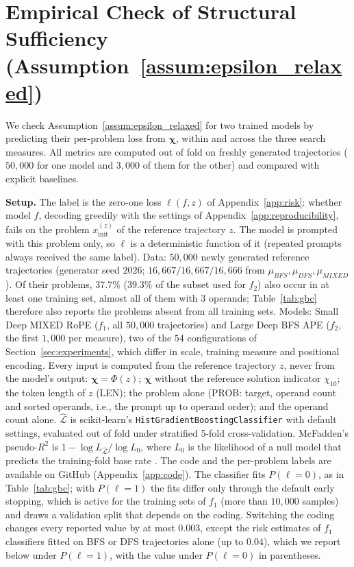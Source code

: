 \section{Empirical Check of Structural Sufficiency (\texorpdfstring{Assumption~\ref{assum:epsilon_relaxed}}{Assumption 1})} %
\label{app:gbc_check}
We check Assumption~\ref{assum:epsilon_relaxed} for two trained models by predicting their per-problem loss from $\boldsymbol{\chi}$, within and across the three search measures. All metrics are computed out of fold on freshly generated trajectories ($50{,}000$ for one model and $3{,}000$ of them for the other) and compared with explicit baselines.

\textbf{Setup.} The label is the zero-one loss $\ell(f,z)$ of Appendix~\ref{app:risk}: whether model $f$, decoding greedily with the settings of Appendix~\ref{app:reproducibility}, fails on the problem $x_{\mathrm{init}}^{(z)}$ of the reference trajectory $z$. The model is prompted with this problem only, so $\ell$ is a deterministic function of it (repeated prompts always received the same label). Data: $50{,}000$ newly generated reference trajectories (generator seed $2026$; $16{,}667/16{,}667/16{,}666$ from $\mu_{BFS},\mu_{DFS},\mu_{MIXED}$). Of their problems, $37.7\%$ ($39.3\%$ of the subset used for $f_2$) also occur in at least one training set, almost all of them with $3$ operands; Table~\ref{tab:gbc} therefore also reports the problems absent from all training sets. Models: Small Deep MIXED RoPE ($f_1$, all $50{,}000$ trajectories) and Large Deep BFS APE ($f_2$, the first $1{,}000$ per measure), two of the $54$ configurations of Section~\ref{sec:experiments}, which differ in scale, training measure and positional encoding. Every input is computed from the reference trajectory $z$, never from the model's output: $\boldsymbol{\chi}=\Phi(z)$; $\boldsymbol{\chi}$ without the reference solution indicator $\chi_{10}$; the token length of $z$ (LEN); the problem alone (PROB: target, operand count and sorted operands, i.e., the prompt up to operand order); and the operand count alone. $\hat{\mathcal{L}}$ is scikit-learn's \texttt{HistGradientBoostingClassifier} \citep{pedregosa2011scikit} with default settings, evaluated out of fold under stratified 5-fold cross-validation. McFadden's pseudo-$R^2$ is $1-\log L_{\hat{\mathcal{L}}}/\log L_0$, where $L_0$ is the likelihood of a null model that predicts the training-fold base rate \citep{mcfadden1979quantitative}. The code and the per-problem labels are available on GitHub (Appendix~\ref{app:code}). The classifier fits $P(\ell{=}0)$, as in Table~\ref{tab:gbc}; with $P(\ell{=}1)$ the fits differ only through the default early stopping, which is active for the training sets of $f_1$ (more than $10{,}000$ samples) and draws a validation split that depends on the coding. Switching the coding changes every reported value by at most $0.003$, except the risk estimates of $f_1$ classifiers fitted on BFS or DFS trajectories alone (up to $0.04$), which we report below under $P(\ell{=}1)$, with the value under $P(\ell{=}0)$ in parentheses.

